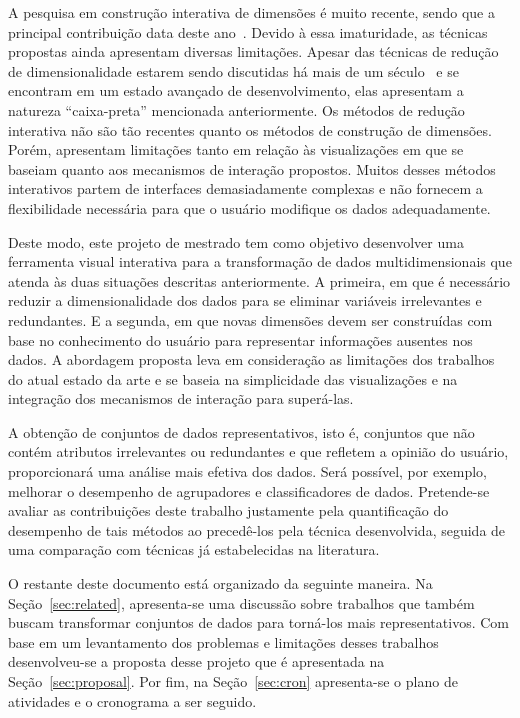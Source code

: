 A pesquisa em construção interativa de dimensões é muito
recente, sendo que a principal contribuição data deste
ano~\cite{Gladys2013}. Devido à essa imaturidade, as
técnicas propostas ainda apresentam diversas limitações.
Apesar das técnicas de redução de dimensionalidade estarem
sendo discutidas há mais de um século~\cite{Pearson1901} e se
encontram em um estado avançado de desenvolvimento, elas 
apresentam a natureza ``caixa-preta'' mencionada
anteriormente.  Os métodos de redução interativa não são tão
recentes quanto os métodos de construção de dimensões.
Porém, apresentam limitações tanto em relação às
visualizações em que se baseiam quanto aos mecanismos de
interação propostos.  Muitos desses métodos interativos
partem de interfaces demasiadamente complexas e não fornecem
a flexibilidade necessária para que o usuário modifique os
dados adequadamente.

Deste modo, este projeto de mestrado tem como objetivo
desenvolver uma ferramenta visual interativa para a
transformação de dados multidimensionais que atenda às duas
situações descritas anteriormente. A primeira, em que é
necessário reduzir a dimensionalidade dos dados para se
eliminar variáveis irrelevantes e redundantes. E a segunda,
em que novas dimensões devem ser construídas com base no
conhecimento do usuário para representar informações
ausentes nos dados. A abordagem proposta leva em
consideração as limitações dos trabalhos do atual estado da
arte e se baseia na simplicidade das visualizações e na
integração  dos mecanismos de interação para superá-las. 

A obtenção de conjuntos de dados representativos, isto é,
conjuntos que não contém atributos irrelevantes ou
redundantes e que refletem a opinião do usuário,
proporcionará uma análise mais efetiva dos dados. Será
possível, por exemplo, melhorar o desempenho de agrupadores
e classificadores de dados. Pretende-se avaliar as
contribuições deste trabalho justamente pela quantificação
do desempenho de tais métodos ao precedê-los pela técnica
desenvolvida, seguida de uma comparação com técnicas já
estabelecidas na literatura.

O restante deste documento está organizado da seguinte
maneira. Na Seção~\ref{sec:related}, apresenta-se uma
discussão sobre trabalhos que também buscam transformar
conjuntos de dados para torná-los mais representativos. Com
base em um levantamento dos problemas e limitações desses
trabalhos desenvolveu-se a proposta desse projeto que é
apresentada na Seção~\ref{sec:proposal}. Por fim, na
Seção~\ref{sec:cron} apresenta-se o plano de atividades e o
cronograma a ser seguido.
